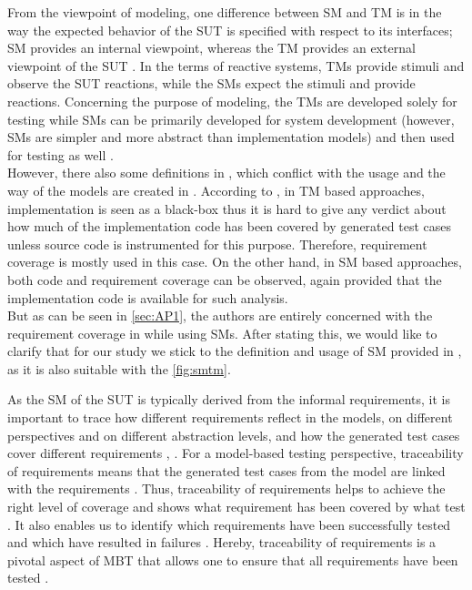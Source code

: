 From the viewpoint of modeling, one difference between SM and TM is in the way the expected behavior of the SUT is specified with respect to its interfaces; SM provides an internal viewpoint, whereas the TM provides an external viewpoint of the SUT \cite{SMvsTM}. In the terms of reactive systems, TMs provide stimuli and observe the SUT reactions, while the SMs expect the stimuli and provide reactions. Concerning the purpose of modeling, the TMs are developed solely for testing while SMs can be primarily developed for system development (however, SMs are simpler and more abstract than implementation models) and then used for testing as well \cite{SMvsTM}. \\
However, there also some definitions in \cite{SMvsTM}, which conflict with the usage and the way of the models are created in \cite{Paper1}. According to \cite{SMvsTM}, in TM based approaches, implementation is seen as a black-box thus it is hard to give any verdict about how much of the implementation code has been covered by generated test cases unless source code is instrumented for this purpose. Therefore, requirement coverage is mostly used in this case. On the other hand, in SM based approaches, both code and requirement coverage can be observed, again provided that the implementation code is available for such analysis. \\
But as can be seen in \autoref{sec:AP1}, the authors are entirely concerned with the requirement coverage in \cite{Paper1} while using SMs. After stating this, we would like to clarify that for our study we stick to the definition and usage of SM provided in \cite{Paper1}, as it is also suitable with the \autoref{fig:smtm}.

As the SM of the SUT is typically derived from the informal requirements, it is important to trace how different requirements reflect in the models, on different perspectives and on different abstraction levels, and how the generated test cases cover different requirements \cite{Paper1}, \cite{SMvsTM}. For a model-based testing perspective, traceability of requirements means that the generated test cases from the model are linked with the requirements \cite{Paper2}. Thus, traceability of requirements helps to achieve the right level of coverage and shows what requirement has been covered by what test \cite{Paper1}. It also enables us to identify which requirements have been successfully tested and which have resulted in failures \cite{Paper1}. Hereby, traceability of requirements is a pivotal aspect of MBT that allows one to ensure that all requirements have been tested  \cite{matera}.


